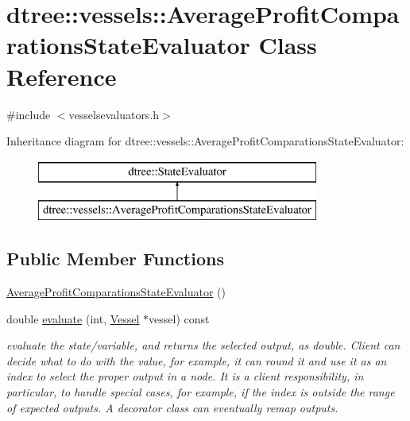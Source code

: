 \hypertarget{classdtree_1_1vessels_1_1_average_profit_comparations_state_evaluator}{}\section{dtree\+::vessels\+::Average\+Profit\+Comparations\+State\+Evaluator Class Reference}
\label{classdtree_1_1vessels_1_1_average_profit_comparations_state_evaluator}


{\ttfamily \#include $<$vesselsevaluators.\+h$>$}

Inheritance diagram for dtree\+::vessels\+::Average\+Profit\+Comparations\+State\+Evaluator\+:\begin{figure}[H]
\begin{center}
\leavevmode
\includegraphics[height=2.000000cm]{d6/d61/classdtree_1_1vessels_1_1_average_profit_comparations_state_evaluator}
\end{center}
\end{figure}
\subsection*{Public Member Functions}
\begin{DoxyCompactItemize}
\item 
\mbox{\hyperlink{classdtree_1_1vessels_1_1_average_profit_comparations_state_evaluator_a6647edcd0bb63246af3c57809d5a01c2}{Average\+Profit\+Comparations\+State\+Evaluator}} ()
\item 
double \mbox{\hyperlink{classdtree_1_1vessels_1_1_average_profit_comparations_state_evaluator_adede06c45d79b7aeebf4c5173168ce3b}{evaluate}} (int, \mbox{\hyperlink{class_vessel}{Vessel}} $\ast$vessel) const
\begin{DoxyCompactList}\small\item\em evaluate the state/variable, and returns the selected output, as double. Client can decide what to do with the value, for example, it can round it and use it as an index to select the proper output in a node. It is a client responsibility, in particular, to handle special cases, for example, if the index is outside the range of expected outputs. A decorator class can eventually remap outputs. \end{DoxyCompactList}\end{DoxyCompactItemize}


